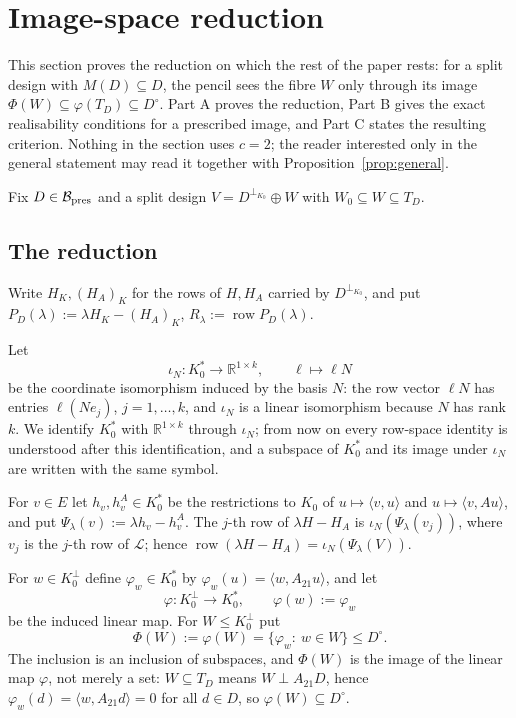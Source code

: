 \documentclass[journal]{IEEEtran}
\theoremstyle{plainn}
\theoremstyle{remark}
\newcommand{\row}{\operatorname{row}}
\begin{document}
\section{Image-space reduction}\label{sec:reduction}

This section proves the reduction on which the rest of the paper rests: for a split design with
$M(D)\subseteq D$, the pencil sees the fibre $W$ only through its image
$\Phi(W)\subseteq\varphi(T_D)\subseteq D^\circ$. Part A proves the reduction, Part B gives the exact
realisability conditions for a prescribed image, and Part C states the resulting criterion. Nothing in
the section uses $c=2$; the reader interested only in the general statement may read it together with
Proposition~\ref{prop:general}.

Fix $D\in\mathcal B_{\rm pres}$ and a split design $V=D^{\perp_{K_0}}\oplus W$ with
$W_0\subseteq W\subseteq T_D$.

\subsection{The reduction}\label{sec:reduction:a}

Write $H_K,(H_A)_K$ for the rows of $H,H_A$ carried by $D^{\perp_{K_0}}$, and put
$P_D(\lambda):=\lambda H_K-(H_A)_K$, $R_\lambda:=\row P_D(\lambda)$.

Let
\begin{equation}\label{eq:iotaN}
\iota_N:K_0^*\longrightarrow\mathbb R^{1\times k},\qquad \ell\longmapsto \ell N
\end{equation}
be the coordinate isomorphism induced by the basis $N$: the row vector $\ell N$ has entries
$\ell(Ne_j)$, $j=1,\dots,k$, and $\iota_N$ is a linear isomorphism because $N$ has rank $k$. We identify
$K_0^*$ with $\mathbb R^{1\times k}$ through $\iota_N$; from now on every row-space identity is understood
after this identification, and a subspace of $K_0^*$ and its image under $\iota_N$ are written with the
same symbol.

For $v\in E$ let $h_v,h^A_v\in K_0^*$ be the restrictions to $K_0$ of $u\mapsto\langle v,u\rangle$ and
$u\mapsto\langle v,Au\rangle$, and put $\Psi_\lambda(v):=\lambda h_v-h^A_v$. The $j$-th row of
$\lambda H-H_A$ is $\iota_N(\Psi_\lambda(v_j))$, where $v_j$ is the $j$-th row of $\mathcal L$; hence
$\row(\lambda H-H_A)=\iota_N(\Psi_\lambda(V))$.

For $w\in K_0^\perp$ define $\varphi_w\in K_0^*$ by $\varphi_w(u)=\langle w,A_{21}u\rangle$, and let
\[
\varphi:K_0^\perp\longrightarrow K_0^*,\qquad \varphi(w):=\varphi_w
\]
be the induced linear map. For $W\le K_0^\perp$ put
\begin{equation}\label{eq:Phi}
\Phi(W):=\varphi(W)=\{\varphi_w:\ w\in W\}\le D^\circ .
\end{equation}
The inclusion is an inclusion of subspaces, and $\Phi(W)$ is the image of the linear map $\varphi$, not
merely a set: $W\subseteq T_D$ means $W\perp A_{21}D$, hence $\varphi_w(d)=\langle w,A_{21}d\rangle=0$ for
all $d\in D$, so $\varphi(W)\subseteq D^\circ$.
\end{document}
